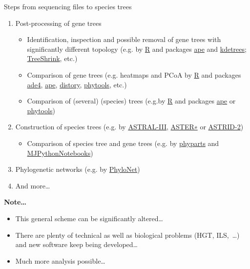 \documentclass[compress, ucs, xelatex, 11pt, xcolor=x11names, aspectratio=169,
	hyperref={
		bookmarks=true,
		unicode=true,
		colorlinks=true,
		pdftitle={HybSeq course},
		plainpages=false,
		pdfauthor={Vojtech Zeisek},
		pdfsubject={Practical processing of HybSeq target enrichment sequencing data on computing grids like MetaCentrum},
		pdfcreator={XeLaTeX},
		pdfkeywords={BASH, command line, GNU, HybSeq, Linux, MetaCentrum, sequencing shell, target enrichment},
		linkcolor=Turquoise4, %
		anchorcolor=DodgerBlue4, %
		citecolor=DodgerBlue4, %
		filecolor=DodgerBlue4, %
		menucolor=Tan4, %
		urlcolor=DarkOliveGreen4, %
		pdftex},
	url={hyphens, lowtilde} %
	]{beamer}
\begin{document}
\begin{frame}[allowframebreaks]{Steps from sequencing files to species trees}
\begin{enumerate}
		\item Post-processing of gene trees
		\begin{itemize}
			\item Identification, inspection and possible removal of gene trees with significantly different topology (e.g. by \href{https://www.r-project.org/}{R} and packages \href{https://cran.r-project.org/package=ape}{ape} and \href{https://cran.r-project.org/package=kdetrees}{kdetrees}; \href{https://github.com/uym2/TreeShrink}{TreeShrink}, etc.)
			\item Comparison of gene trees (e.g. heatmaps and PCoA by \href{https://www.r-project.org/}{R} and packages \href{https://cran.r-project.org/package=ade4}{ade4}, \href{https://cran.r-project.org/package=ape}{ape}, \href{https://cran.r-project.org/package=distory}{distory}, \href{https://cran.r-project.org/package=phytools}{phytools}, etc.)
			\item Comparison of (several) (species) trees (e.g.by \href{https://www.r-project.org/}{R} and packages \href{https://cran.r-project.org/package=ape}{ape} or \href{https://cran.r-project.org/package=phytools}{phytools})
		\end{itemize}
		\item Construction of species trees (e.g. by \href{https://github.com/smirarab/ASTRAL}{ASTRAL-III}, \href{https://github.com/chaoszhang/ASTER}{ASTER∗} or \href{https://github.com/pranjalv123/ASTRID}{ASTRID-2})
		\begin{itemize}
			\item Comparison of species tree and gene trees (e.g. by \href{https://bitbucket.org/blackrim/phyparts}{phyparts} and \href{https://github.com/mossmatters/MJPythonNotebooks}{MJPythonNotebooks})
		\end{itemize}
		\item Phylogenetic networks (e.g. by \href{https://phylogenomics.rice.edu/html/phylonet.html}{PhyloNet})
		\item And more\ldots
	\end{enumerate}
	\vfill
	\begin{block}{\textbf{Note\ldots}}
		\begin{itemize}
			\item This general scheme can be significantly altered\ldots
			\item There are plenty of technical as well as biological problems (HGT, ILS,~\ldots) and new software keep being developed\ldots
			\item Much more analysis possible\ldots
		\end{itemize}
	\end{block}
	\vfill
\end{frame}
\end{document}
